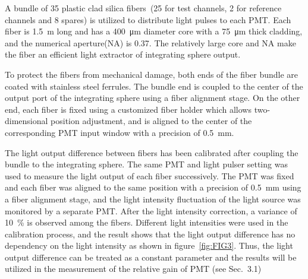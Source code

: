 \documentclass{JINST}
\begin{document}
A bundle of 35 plastic clad silica fibers~\cite{optical_fibre}(25 for test channels, 2 for reference channels and 8 spares) is utilized to distribute light pulses to each PMT.	Each fiber is \SI{1.5}{\meter} long and has a \SI{400}{\micro\meter} diameter core with a \SI{75}{\micro\meter} thick cladding, and the numerical aperture(NA) is 0.37.
The relatively large core and NA make the fiber an efficient light extractor of integrating sphere output. 
	
To protect the fibers from mechanical damage, both ends of the fiber bundle are coated with stainless steel ferrules.
The bundle end is coupled to the center of the output port of the integrating sphere using a fiber alignment stage.
On the other end, each fiber is fixed using a customized fiber holder which allows two-dimensional position adjustment, and is aligned to the center of the corresponding PMT input window with a precision of \SI{0.5}{\milli\meter}.
	
The light output difference between fibers has been calibrated after coupling the bundle to the integrating sphere.
The same PMT and light pulser setting was used to measure the light output of each fiber successively.
The PMT was fixed and each fiber was aligned to the same position with a precision of \SI{0.5}{\milli\meter} using a fiber alignment stage, and the light intensity fluctuation of the light source was monitored by a separate PMT.
After the light intensity correction, a variance of \SI{10}{\percent} is observed among the fibers.
Different light intensities were used in the calibration process, and the result shows that the light output difference has no dependency on the light intensity as shown in figure~\ref{fig:FIG3}. 
Thus, the light output difference can be treated as a constant parameter and the results will be utilized in the measurement of the relative gain of PMT (see Sec.~3.1)
	
\end{document}
